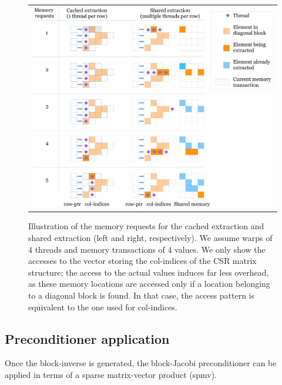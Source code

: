 \begin{figure}
\begin{center}
\begin{tabular}{r}
\includegraphics[width=.85\columnwidth]{plots/shared_extraction_legend}
\end{tabular}
\end{center}
\caption{Illustration of the memory requests for the cached extraction and shared extraction (left and right, respectively).
We assume warps of 4 threads and memory transactions of 4 values.
We only show the accesses to the vector storing the {\sf col-indices} of the CSR matrix structure; 
the access to the actual values induces far less overhead,
as these memory locations are accessed only if a location belonging to a diagonal block is found.
In that case, the access pattern is equivalent to the one used for {\sf col-indices}.
}
\label{fig:memtransact}
\end{figure}

\subsection{Preconditioner application}
\label{sec:precapply}
Once the block-inverse is generated,
the block-Jacobi preconditioner can be applied in terms 
of a sparse matrix-vector product
({\sc spmv}).

